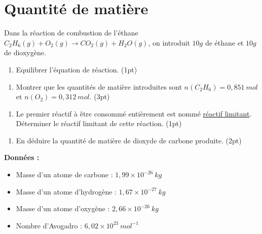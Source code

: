 \documentclass[a4paper,11pt,fleqn]{scrartcl}%
\begin{document}
\section{Quantité de matière}
Dans la réaction  de combustion de l'éthane $C_2H_6(g) + O_2(g) \rightarrow CO_2(g) + H_2O(g)$, on introduit $10g$ de éthane et $10g$ de dioxygène.

\begin{enumerate}
    \item Equilibrer l’équation de réaction. (1pt)
    \end{enumerate}
    \noindent\fbox{
    \begin{minipage}{\textwidth}
        \TextField[
            multiline=true,
            width=\linewidth,
            height=2em
        ]{}
    \end{minipage}
}
    \begin{enumerate}[resume]
    \item Montrer que les quantités de matière introduites sont $n(C_2H_6) = 0,851~mol$ et $n(O_2) = 0,312~mol$. (3pt)
    \end{enumerate}
    \noindent\fbox{
    \begin{minipage}{\textwidth}
        \TextField[
            multiline=true,
            width=\linewidth,
            height=10em
        ]{}
    \end{minipage}
}
    \begin{enumerate}[resume]
    \item Le premier réactif à être consommé entièrement est nommé \underline{réactif limitant}. Déterminer le réactif limitant de cette réaction. (1pt)
    \end{enumerate}
    \noindent\fbox{
    \begin{minipage}{\textwidth}
        \TextField[
            multiline=true,
            width=\linewidth,
            height=8em
        ]{}
    \end{minipage}
}
    \begin{enumerate}[resume]
    \item En déduire la quantité de matière de dioxyde de carbone produite. (2pt)
\end{enumerate}
\noindent\fbox{
    \begin{minipage}{\textwidth}
        \TextField[
            multiline=true,
            width=\linewidth,
            height=8em
        ]{}
    \end{minipage}
}

\textbf{Données :}
\begin{itemize}
    \item Masse d'un atome de carbone : $1,99 \times 10^{-26}~kg$
    \item Masse d'un atome d'hydrogène : $1,67 \times 10^{-27}~kg$
    \item Masse d'un atome d'oxygène : $2,66 \times 10^{-26}~kg$
    \item Nombre d'Avogadro : $6,02 \times 10^{23}~mol^{-1}$
\end{itemize}
\end{document}
